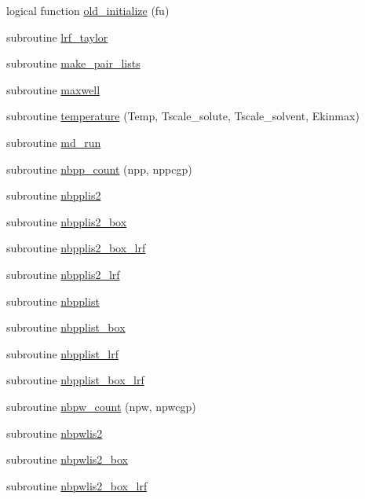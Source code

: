 \begin{DoxyCompactItemize}
\item 
logical function \hyperlink{classmd_a07b781fabc881157203b600278e8d17d}{old\-\_\-initialize} (fu)
\item 
subroutine \hyperlink{classmd_a1d02af0284b3c3aa3c99dd0b6779182f}{lrf\-\_\-taylor}
\item 
subroutine \hyperlink{classmd_a16887155a7619c59d173cfb16e7314e7}{make\-\_\-pair\-\_\-lists}
\item 
subroutine \hyperlink{classmd_a91f8196b3801e0ea7c8c1fd77916cb40}{maxwell}
\item 
subroutine \hyperlink{classmd_a6c84a60a569106b78c66542408b559d4}{temperature} (Temp, Tscale\-\_\-solute, Tscale\-\_\-solvent, Ekinmax)
\item 
subroutine \hyperlink{classmd_a171682c3783373090d6525d6b435211e}{md\-\_\-run}
\item 
subroutine \hyperlink{classmd_a866f21048aa5353f43c96963ec78eb3d}{nbpp\-\_\-count} (npp, nppcgp)
\item 
subroutine \hyperlink{classmd_a28f26bd7ab24879172cc589fd3a71024}{nbpplis2}
\item 
subroutine \hyperlink{classmd_a0e44f9dccd622bae4e2d982ece5c3423}{nbpplis2\-\_\-box}
\item 
subroutine \hyperlink{classmd_ad21d3a65785ca8c2f10ae17ce21f463e}{nbpplis2\-\_\-box\-\_\-lrf}
\item 
subroutine \hyperlink{classmd_a92e05e5a3c50acde2fc700cce4af3a32}{nbpplis2\-\_\-lrf}
\item 
subroutine \hyperlink{classmd_a744aa0ac0e0c15656cc4b5fc7ab6d04f}{nbpplist}
\item 
subroutine \hyperlink{classmd_a54332666551135beedcfb89e4ce019d3}{nbpplist\-\_\-box}
\item 
subroutine \hyperlink{classmd_a3cdc19052d14a51219bdd4a58fe2cf3b}{nbpplist\-\_\-lrf}
\item 
subroutine \hyperlink{classmd_a83da9a1f7c60fbccfdb91504751a9abf}{nbpplist\-\_\-box\-\_\-lrf}
\item 
subroutine \hyperlink{classmd_a923274387568268f10dc8c5f1fa09210}{nbpw\-\_\-count} (npw, npwcgp)
\item 
subroutine \hyperlink{classmd_ade82e5241d0ab3332844e2f8bd1d317d}{nbpwlis2}
\item 
subroutine \hyperlink{classmd_a52d03dd3085b87c8734115dc3b4b4131}{nbpwlis2\-\_\-box}
\item 
subroutine \hyperlink{classmd_a5b61618ae56e51fef3e5cc4b5a6b27f7}{nbpwlis2\-\_\-box\-\_\-lrf}
\item 

\end{DoxyCompactItemize}
